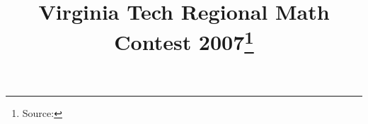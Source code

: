 \documentclass[10pt]{article}
\begin{document}
\title{Virginia Tech Regional Math Contest 2007\footnote{Source: \source}}
\author{\vspace{-2ex}}
\date{\vspace{-6ex}} %
\maketitle







\end{document}
